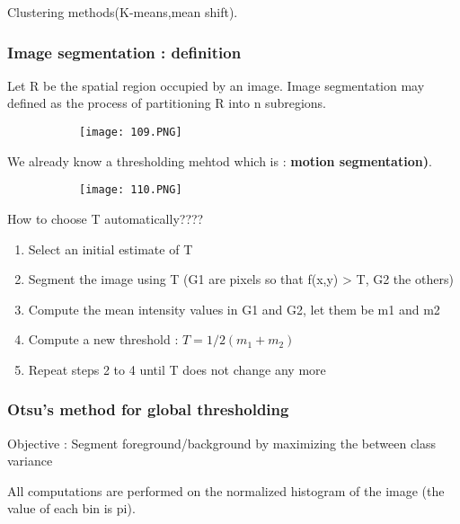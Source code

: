 \documentclass{article}
\begin{document}
Clustering methods(K-means,mean shift).

\subsubsection{Image segmentation : definition}

Let R be the spatial region occupied by an image. Image segmentation may defined as the process of partitioning R into n subregions.

\begin{figure}[ht!]
  \centering
  \begin{subfigure}[b]{0.7\linewidth}
    \texttt{[image: 109.PNG]}
  \end{subfigure}
\end{figure}

We already know a thresholding mehtod which is : \textbf{motion segmentation)}.

\begin{figure}[ht!]
  \centering
  \begin{subfigure}[b]{0.7\linewidth}
    \texttt{[image: 110.PNG]}
  \end{subfigure}
\end{figure}

How to choose T automatically????

\begin{enumerate}
    \item Select an initial estimate of T
    \item Segment the image using T (G1 are pixels so that f(x,y) > T, G2 the others)
    \item Compute the mean intensity values in G1 and G2, let them be m1 and m2
    \item Compute a new threshold : $T = 1/2 (m_1 + m_2)$
    \item Repeat steps 2 to 4 until T does not change any more
\end{enumerate}

\subsubsection{Otsu's method for global thresholding}

Objective : Segment foreground/background by maximizing the between class variance

All computations are performed on the normalized histogram of the image (the value of each bin is pi).
\end{document}
